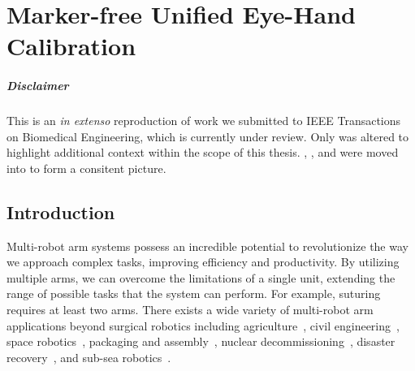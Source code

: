 \graphicspath{{chapter_1}}
\chapter[Marker-free Unified Eye-Hand Calibration]{Marker-free Unified Eye-Hand Calibration}
\label{chap:registration}
\minitoc

\paragraph{Disclaimer} This  is an \textit{in extenso} reproduction of work we submitted to IEEE Transactions on Biomedical Engineering, which is currently under review. Only  was altered to highlight additional context within the scope of this thesis. , , and  were moved into  to form a consitent picture.

\newpage

\section{Introduction}
\label{c1:sec:introduction}
Multi-robot arm systems possess an incredible potential to revolutionize the way we approach complex tasks, improving efficiency and productivity. 
By utilizing multiple arms, we can overcome the limitations of a single unit, extending the range of possible tasks that the system can perform. 
For example, suturing requires at least two arms.
There exists a wide variety of multi-robot arm applications beyond surgical robotics including 
agriculture~\cite{Xiong20}, 
civil engineering~\cite{Yasutomi23}, 
space robotics~\cite{Yan20},
packaging and assembly~\cite{Do12},
nuclear decommissioning~\cite{Mohamed07},
disaster recovery~\cite{Kamezaki16}, and
sub-sea robotics~\cite{Brantner21}.


